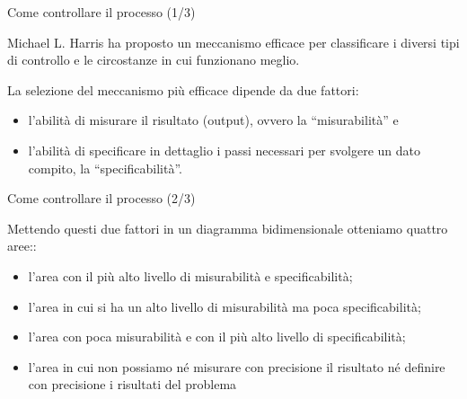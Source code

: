 \documentclass{beamer}
\begin{document}
\begin{frame}{\centerline{Come controllare il processo (1/3)}}


Michael L. Harris ha proposto un meccanismo efficace per classificare i diversi tipi di controllo e le circostanze in cui funzionano meglio.
\newline 

La selezione del meccanismo pi\`{u} efficace dipende da due fattori:
\begin{itemize}
\item  l'abilit\`{a} di misurare il risultato (output), ovvero la ``misurabilit\`{a}'' e

\item  l'abilit\`{a} di specificare in dettaglio i passi necessari per svolgere un dato compito, la ``specificabilit\`{a}''.
\end{itemize}
\end{frame}

\begin{frame}{\centerline{Come controllare il processo (2/3)}}

Mettendo questi due fattori in un diagramma bidimensionale otteniamo quattro aree::
\begin{itemize}

\item  l'area con il pi\`{u} alto livello di misurabilit\`{a} e specificabilit\`{a};

\item  l'area in cui si ha un alto livello di misurabilit\`{a} ma poca specificabilit\`{a};

\item  l'area con poca misurabilit\`{a} e con il pi\`{u} alto livello di specificabilit\`{a};

\item  l'area in cui non possiamo n\'{e} misurare con precisione il risultato n\'{e} definire con precisione i risultati del problema 

\end{itemize}
\end{frame}
\end{document}
